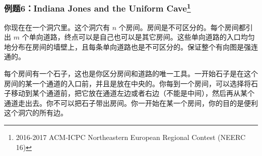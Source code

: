 \documentclass[10pt]{beamer}
\begin{document}
	\begin{frame}
		\frametitle{例题6：Indiana Jones and the Uniform Cave\footnote{2016-2017 ACM-ICPC Northeastern European Regional Contest (NEERC 16)}}

		你现在在一个洞穴里。这个洞穴有 $n$ 个房间。房间是不可区分的。每个房间都引出 $m$ 个单向道路，终点可以是自己也可以是其它房间。这些单向道路的入口均匀地分布在房间的墙壁上，且每条单向道路也是不可区分的。保证整个有向图是强连通的。
		
		每个房间有一个石子，这也是你区分房间和道路的唯一工具。一开始石子是在这个房间的某一个通道的入口前，并且是放在中央的。你每到一个房间，可以选择将石子移动到某个通道前，把它放在通道左边或者右边（不能是中间），然后再从某个通道走出去。你不可以把石子带出房间。你一开始在某一个房间，你的目的是便利这个洞穴的所有边。
	\end{frame}
		
\end{document}
